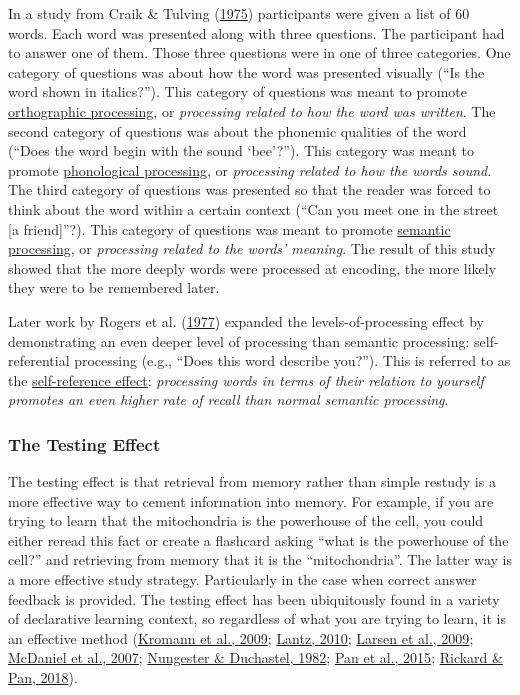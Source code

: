 \documentclass[
]{krantz}
\begin{document}
In a study from Craik \& Tulving (\protect\hyperlink{ref-Craik1975}{1975}) participants were given a list of 60 words. Each word was presented along with three questions. The participant had to answer one of them. Those three questions were in one of three categories. One category of questions was about how the word was presented visually (``Is the word shown in italics?''). This category of questions was meant to promote \protect\hyperlink{orthographic-processing}{orthographic processing}, or \emph{processing related to how the word was written}. The second category of questions was about the phonemic qualities of the word (``Does the word begin with the sound `bee'?''). This category was meant to promote \protect\hyperlink{phonological-processing}{phonological processing}, or \emph{processing related to how the words sound}. The third category of questions was presented so that the reader was forced to think about the word within a certain context (``Can you meet one in the street {[}a friend{]}''?). This category of questions was meant to promote \protect\hyperlink{semantic-processing}{semantic processing}, or \emph{processing related to the words' meaning}. The result of this study showed that the more deeply words were processed at encoding, the more likely they were to be remembered later.

Later work by Rogers et al. (\protect\hyperlink{ref-Rogers1977}{1977}) expanded the levels-of-processing effect by demonstrating an even deeper level of processing than semantic processing: self-referential processing (e.g., ``Does this word describe you?''). This is referred to as the \protect\hyperlink{self-reference-effect}{self-reference effect}: \emph{processing words in terms of their relation to yourself promotes an even higher rate of recall than normal semantic processing}.

\hypertarget{the-testing-effect}{%
\subsubsection*{The Testing Effect}\label{the-testing-effect}}


The testing effect is that retrieval from memory rather than simple restudy is a more effective way to cement information into memory. For example, if you are trying to learn that the mitochondria is the powerhouse of the cell, you could either reread this fact or create a flashcard asking ``what is the powerhouse of the cell?'' and retrieving from memory that it is the ``mitochondria''. The latter way is a more effective study strategy. Particularly in the case when correct answer feedback is provided. The testing effect has been ubiquitously found in a variety of declarative learning context, so regardless of what you are trying to learn, it is an effective method (\protect\hyperlink{ref-Kromann2009}{Kromann et al., 2009}; \protect\hyperlink{ref-Lantz2010}{Lantz, 2010}; \protect\hyperlink{ref-Larsen2009}{Larsen et al., 2009}; \protect\hyperlink{ref-McDaniel2007}{McDaniel et al., 2007}; \protect\hyperlink{ref-Nungester1982}{Nungester \& Duchastel, 1982}; \protect\hyperlink{ref-Pan2015}{Pan et al., 2015}; \protect\hyperlink{ref-Rickard2018}{Rickard \& Pan, 2018}).
\end{document}

